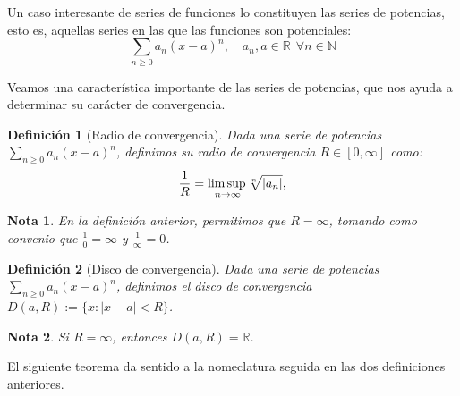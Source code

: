 \documentclass[11pt, a4paper]{article}
\theoremstyle{theorem-style}
\theoremstyle{definition-style}
\newtheorem{ndef}{Definición}[section]
\theoremstyle{remark-style}
\newtheorem*{nota}{Nota}
\theoremstyle{example-style}
\begin{document}
Un caso interesante de series de funciones lo constituyen las series de potencias, esto es, aquellas series en las que las funciones son potenciales: $$\sum_{n \ge 0} a_n(x-a)^n, \quad a_n, a \in \mathbb{R} \ \ \forall n \in \mathbb{N}$$

Veamos una característica importante de las series de potencias, que nos ayuda a determinar su carácter de convergencia.

\begin{ndef}[Radio de convergencia] Dada una serie de potencias $\sum_{n \ge 0} a_n(x-a)^n$, definimos su radio de convergencia $R \in [0, \infty]$ como: $$
\frac{1}{R} =\underset{n\to\infty}{\mbox{lim\,sup\,}}  \sqrt[n]{|a_n|},$$
\end{ndef}

\begin{nota}
	En la definición anterior, permitimos que $R = \infty$, tomando como convenio que $\frac{1}{0} = \infty$ y $\frac{1}{\infty} = 0$.
\end{nota}

\begin{ndef}[Disco de convergencia] Dada una serie de potencias $\sum_{n \ge 0} a_n(x-a)^n$, definimos el disco de convergencia $D(a,R) := \{ x : |x-a| < R\}$. 
\end{ndef}

\begin{nota}
	Si $R = \infty$, entonces $D(a,R) = \mathbb{R}$.
\end{nota}

El siguiente teorema da sentido a la nomeclatura seguida en las dos definiciones anteriores.
\end{document}
